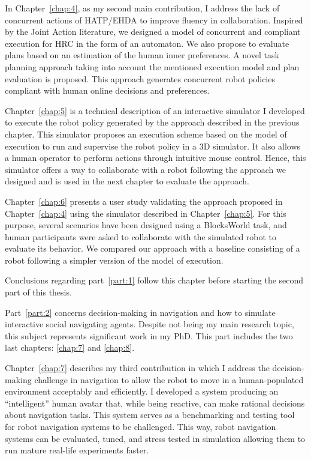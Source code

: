 In Chapter~\ref{chap:4}, as my second main contribution, I address the lack of concurrent actions of HATP/EHDA to improve fluency in collaboration. Inspired by the Joint Action literature, we designed a model of concurrent and compliant execution for HRC in the form of an automaton. We also propose to evaluate plans based on an estimation of the human inner preferences. A novel task planning approach taking into account the mentioned execution model and plan evaluation is proposed. This approach generates concurrent robot policies compliant with human online decisions and preferences. 

Chapter~\ref{chap:5} is a technical description of an interactive simulator I developed to execute the robot policy generated by the approach described in the previous chapter. This simulator proposes an execution scheme based on the model of execution to run and supervise the robot policy in a 3D simulator. It also allows a human operator to perform actions through intuitive mouse control. Hence, this simulator offers a way to collaborate with a robot following the approach we designed and is used in the next chapter to evaluate the approach.    

Chapter~\ref{chap:6} presents a user study validating the approach proposed in Chapter~\ref{chap:4} using the simulator described in Chapter~\ref{chap:5}. For this purpose, several scenarios have been designed using a BlocksWorld task, and human participants were asked to collaborate with the simulated robot to evaluate its behavior. We compared our approach with a baseline consisting of a robot following a simpler version of the model of execution. 

Conclusions regarding part~\ref{part:1} follow this chapter before starting the second part of this thesis. 

Part~\ref{part:2} concerns decision-making in navigation and how to simulate interactive social navigating agents. Despite not being my main research topic, this subject represents significant work in my PhD. This part includes the two last chapters: \ref{chap:7} and \ref{chap:8}.

Chapter~\ref{chap:7} describes my third contribution in which I address the decision-making challenge in navigation to allow the robot to move in a human-populated environment acceptably and efficiently. I developed a system producing an ``intelligent'' human avatar that, while being reactive, can make rational decisions about navigation tasks. This system serves as a benchmarking and testing tool for robot navigation systems to be challenged. This way, robot navigation systems can be evaluated, tuned, and stress tested in simulation allowing them to run mature real-life experiments faster.  

